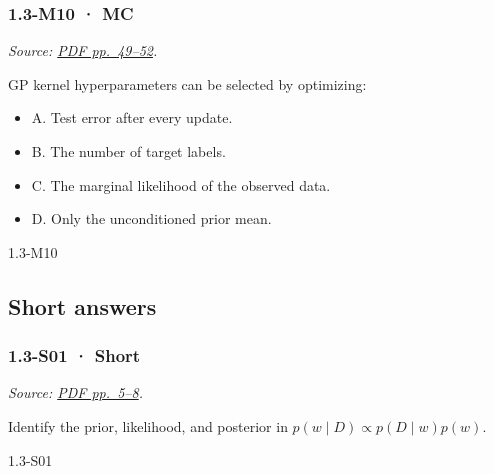 \noindent\begin{minipage}{\linewidth}

\subsubsection{1.3-M10 · MC}\label{m10-mc-2}

\emph{Source:
\href{../Lecture\%20Slides/1.3.\%20Bayesian\%20Learning.pdf\#page=49}{PDF
pp.~49--52}.}

GP kernel hyperparameters can be selected by optimizing:

\begin{itemize}
\tightlist
\item
  A. Test error after every update.
\item
  B. The number of target labels.
\item
  C. The marginal likelihood of the observed data.
\item
  D. Only the unconditioned prior mean.
\end{itemize}

\begin{solution}[8mm]{1.3-M10}

\end{solution}
\end{minipage}\par\medskip

\subsection{Short answers}\label{short-answers-2}

\noindent\begin{minipage}{\linewidth}

\subsubsection{1.3-S01 · Short}\label{s01-short-2}

\emph{Source:
\href{../Lecture\%20Slides/1.3.\%20Bayesian\%20Learning.pdf\#page=5}{PDF
pp.~5--8}.}

Identify the prior, likelihood, and posterior in
\(p(w\mid D)\propto p(D\mid w)p(w)\).

\begin{solution}[20mm]{1.3-S01}

\end{solution}
\end{minipage}\par\medskip

